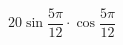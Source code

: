 \begin{ex}
	\begin{condition}
		\( 20\sin\dfrac{5\pi}{12}\cdot\cos\dfrac{5\pi}{12} \)
	\end{condition}
\end{ex}